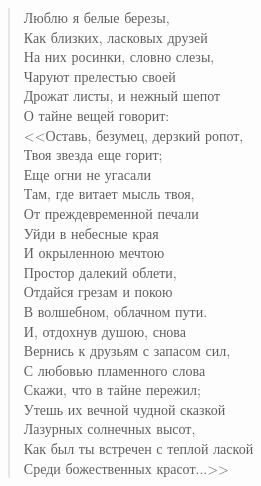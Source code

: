 \begin{verse}
\begin{altverse}
    Люблю я белые березы,\\
Как близких, ласковых друзей\ldotst\\
    На них росинки, словно слезы,\\
Чаруют прелестью своей\ldotst\\
	Дрожат листы, и нежный шепот\\
О тайне вещей говорит:\\
    <<Оставь, безумец, дерзкий ропот,\\
Твоя звезда еще горит;\\
    Еще огни не угасали\\
Там, где витает мысль твоя,\\
    От преждевременной печали\\
Уйди в небесные края\ldotst\\
    И окрыленною мечтою\\
Простор далекий облети,\\
    Отдайся грезам и покою\\
В волшебном, облачном пути.\\
    И, отдохнув душою, снова\\
Вернись к друзьям с запасом сил,\\
    С любовью пламенного слова\\
Скажи, что в тайне пережил;\\
    Утешь их вечной чудной сказкой\\
Лазурных солнечных высот,\\
Как был ты встречен с теплой лаской\\
Среди божественных красот...>>
\end{altverse}
\end{verse}


\newpage
\vspace*{0cm}




